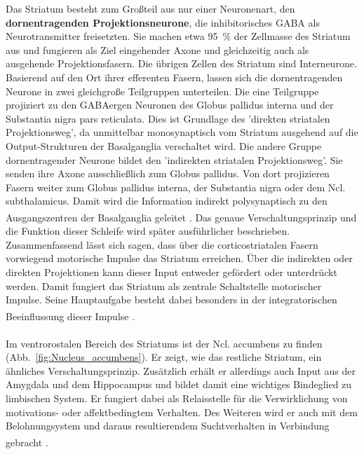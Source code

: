 Das Striatum besteht zum Großteil aus nur einer Neuronenart, den \textbf{dornentragenden Projektionsneurone}, die inhibitorisches GABA als Neurotransmitter freisetzten. Sie machen etwa 95~\% der Zellmasse des Striatum aus und fungieren als Ziel eingehender Axone und gleichzeitig auch als ausgehende Projektionsfasern. Die übrigen Zellen des Striatum sind Interneurone. Basierend auf den Ort ihrer efferenten Fasern, lassen sich die dornentragenden Neurone in zwei gleichgroße Teilgruppen unterteilen. Die eine Teilgruppe projiziert zu den GABAergen Neuronen des Globus pallidus interna und der Substantia nigra pars reticulata. Dies ist Grundlage des 'direkten striatalen Projektionsweg', da unmittelbar monosynaptisch vom Striatum ausgehend auf die Output-Strukturen der Basalganglia verschaltet wird. Die andere Gruppe dornentragender Neurone bildet den 'indirekten striatalen Projektionsweg'. Sie senden ihre Axone ausschließlich zum Globus pallidus. Von dort projizieren Fasern weiter zum Globus pallidus interna, der Substantia nigra oder dem Ncl. subthalamicus. Damit wird die Information indirekt polysynaptisch zu den Ausgangszentren der Basalganglia geleitet \textsuperscript{\cite[Kap.~17]{paxinos2014rat}}. Das genaue Verschaltungsprinzip und die Funktion dieser Schleife wird später ausführlicher beschrieben. Zusammenfassend lässt sich sagen, dass über die corticostriatalen Fasern vorwiegend motorische Impulse das Striatum erreichen. Über die indirekten oder direkten Projektionen kann dieser Input entweder gefördert oder unterdrückt werden. Damit fungiert das Striatum als zentrale Schaltstelle motorischer Impulse. Seine Hauptaufgabe besteht dabei besonders in der integratorischen Beeinflussung dieser Impulse \textsuperscript{\cite[Kap.~9]{trepel2011neuroanatomie}}.\\  
\\ \noindent Im ventrorostalen Bereich des Striatums ist der Ncl. accumbens zu finden (Abb.~\ref{fig:Nucleus_accumbens}). Er zeigt, wie das restliche Striatum, ein ähnliches Verschaltungsprinzip. Zusätzlich erhält er allerdings auch Input aus der Amygdala und dem Hippocampus und bildet damit eine wichtiges Bindeglied zu limbischen System. Er fungiert dabei als Relaisstelle für die Verwirklichung von motivations- oder affektbedingtem Verhalten. Des Weiteren wird er auch mit dem Belohnungsystem und daraus resultierendem Suchtverhalten in Verbindung gebracht \textsuperscript{\cite[Kap.~14]{crossman2014neuroanatomy}}.  

